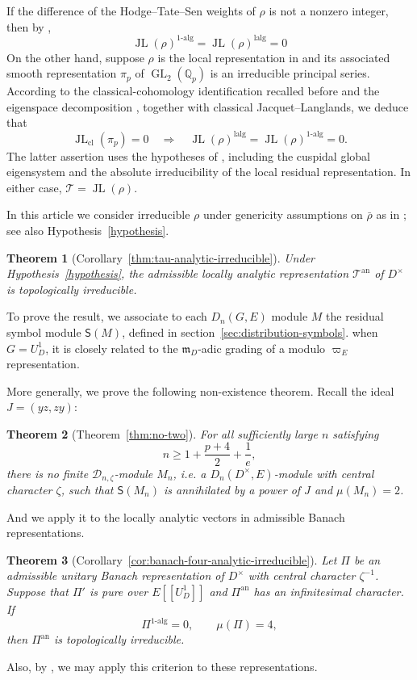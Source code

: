 \documentclass[11pt]{article}
\newtheorem*{mainresult}{Theorem}
\theoremstyle{definition}
\newcommand{\GL}{\operatorname{GL}}
\newcommand{\JL}{\operatorname{JL}}
\newcommand{\Tau}{\mathcal T}
\begin{document}
If the difference of the
Hodge--Tate--Sen weights of $\rho$ is not a nonzero integer, then by \cite[Theorem~8.17]{DPS23},
\[
 \JL(\rho)^{1\text{-}\mathrm{alg}}
 =\JL(\rho)^{\mathrm{lalg}}=0
\] 
On the other hand, suppose $\rho$ is the local
representation in \cite[Theorem~3.20]{LiSuWu2026} and its associated
smooth representation $\pi_p$ of $\GL_2(\mathbb Q_p)$ is an irreducible
principal series. According to the classical-cohomology identification recalled
before \cite[Theorem~3.14]{LiSuWu2026} and the eigenspace
decomposition \cite[(56)]{LiSuWu2026}, together with classical
Jacquet--Langlands, we deduce that
\[
 \JL_{\mathrm{cl}}(\pi_p)=0
 \quad\Longrightarrow\quad
 \JL(\rho)^{\mathrm{lalg}}
 =\JL(\rho)^{1\text{-}\mathrm{alg}}=0.
\]
The latter assertion uses the hypotheses of
\cite[Theorem~3.20]{LiSuWu2026}, including the cuspidal global
eigensystem and the absolute irreducibility of the local residual
representation.
In either case, $\Tau=\JL(\rho)$.

In this article we consider irreducible $\rho$ under genericity assumptions on $\bar{\rho}$ as in \cite[Definition~4.4]{HuWangPadic}; see also Hypothesis~\ref{hypothesis}.

\begin{mainresult}[Corollary~\ref{thm:tau-analytic-irreducible}]
Under Hypothesis~\ref{hypothesis}, the admissible locally analytic
representation $\Tau^{\mathrm{an}}$ of $D^\times$ is topologically
irreducible.
\end{mainresult}
To prove the result, 
we associate to each $D_n(G, E)$ module $M$ the residual symbol module $\mathsf{S}(M)$, defined in section~\ref{sec:distribution-symbols}.
when $G=U_D^1$, it is closely related
to the $\mathfrak{m}_D$-adic grading of a modulo $\varpi_E$ representation.

More generally, we prove the following non-existence theorem. Recall the ideal $J=(yz, zy)$:
\begin{mainresult}[Theorem~\ref{thm:no-two}]
For all sufficiently large $n$ satisfying
\[
 n\geq1+\frac{p+4}{2}+\frac1e,
\]
there is no finite $\mathscr D_{n,\zeta}$-module $M_n$, i.e. a $D_n(D^\times, E)$-module with central character $\zeta$, such that
$\mathsf S(M_n)$ is annihilated by a power of $J$ and
$\mu(M_n)=2$.
\end{mainresult}
And we apply it to the locally analytic vectors in admissible Banach representations.
\begin{mainresult}[Corollary~\ref{cor:banach-four-analytic-irreducible}]
      Let $\Pi$ be an admissible unitary Banach representation of
$D^\times$ with central character $\zeta^{-1}$.
Suppose that $\Pi'$ is pure over $E[\![U_D^1]\!]$ and
$\Pi^{\mathrm{an}}$ has an infinitesimal character. If
\[
 \Pi^{1\text{-}\mathrm{alg}}=0,\qquad \mu(\Pi)=4,
\]
then $\Pi^{\mathrm{an}}$ is topologically irreducible.
\end{mainresult}
Also, by \cite[Corollary~6.2]{LiuWang2025}, we may apply this criterion to these representations. 
\end{document}
